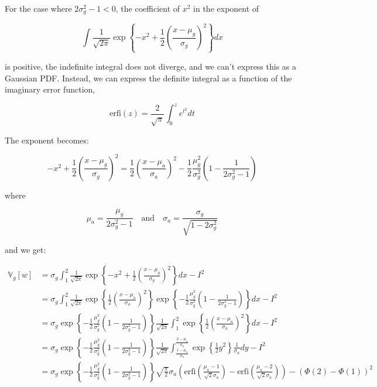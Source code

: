 For the case where \(2 \sigma_g^2 - 1 < 0\), the coefficient of \(x^2\)
in the exponent of

\[ \int \frac{1}{\sqrt{2 \pi}} \exp \left\{ -x^2 +\frac{1}{2} \left(\frac{x - \mu_g}{\sigma_g}\right)^2 \right\} dx \]

is positive, the indefinite integral does not diverge, and we can't
express this as a Gaussian PDF. Instead, we can express the definite
integral as a function of the imaginary error function,

\[ \text{erfi}(z) = \frac{2}{\sqrt{\pi}} \int_0^z e^{t^2} dt \]

The exponent becomes:

\[ 
-x^2 +\frac{1}{2} \left(\frac{x - \mu_g}{\sigma_g}\right)^2 = \frac{1}{2} \left( \frac{x - \mu_a}{\sigma_a} \right)^2 - \frac{1}{2} \frac{\mu_g^2}{\sigma_g^2} \left(1 - \frac{1}{2\sigma_g^2 - 1} \right)
\]

where

\[ \mu_a = \frac{\mu_g}{2\sigma_g^2 - 1} 
\quad \text{and} \quad
\sigma_a = \frac{\sigma_g}{\sqrt{1 - 2 \sigma_g^2}} \]

and we get:

\[
\begin{align}
\mathbb{V}_g[w] &= \sigma_g \int_1^2 \frac{1}{\sqrt{2 \pi}} \exp \left\{ -x^2 +\frac{1}{2} \left(\frac{x - \mu_g}{\sigma_g}\right)^2 \right\} dx - I^2 \\
&= \sigma_g \int_1^2 \frac{1}{\sqrt{2 \pi}} \exp \left\{ \frac{1}{2} \left( \frac{x - \mu_a}{\sigma_a} \right)^2 \right\} \exp \left\{ - \frac{1}{2} \frac{\mu_g^2}{\sigma_g^2} \left(1 - \frac{1}{2\sigma_g^2 - 1} \right) \right\} dx - I^2 \\
&= \sigma_g \exp \left\{ - \frac{1}{2} \frac{\mu_g^2}{\sigma_g^2} \left(1 - \frac{1}{2\sigma_g^2 - 1} \right) \right\} \frac{1}{\sqrt{2 \pi}} \int_1^2 \exp \left\{ \frac{1}{2} \left( \frac{x - \mu_a}{\sigma_a} \right)^2 \right\} dx - I^2 \\
&= \sigma_g \exp \left\{ - \frac{1}{2} \frac{\mu_g^2}{\sigma_g^2} \left(1 - \frac{1}{2\sigma_g^2 - 1} \right) \right\} \frac{1}{\sqrt{2 \pi}} \int_{\frac{1 - \mu_a}{\sigma_a}}^{\frac{2 - \mu_a}{\sigma_a}} \exp \left\{ \frac{1}{2} y^2 \right\} \frac{1}{\sigma_a} dy - I^2 \\
&= \sigma_g \exp \left\{ - \frac{1}{2} \frac{\mu_g^2}{\sigma_g^2} \left(1 - \frac{1}{2\sigma_g^2 - 1} \right) \right\} \sqrt{\frac{\pi}{2}} \sigma_a \left( \text{erfi}\left( \frac{\mu_a - 1}{\sqrt{2} \sigma_a} \right) - \text{erfi}\left( \frac{\mu_a - 2}{\sqrt{2} \sigma_a} \right) \right) - \left( \Phi(2) - \Phi(1) \right)^2
\end{align}
\]

